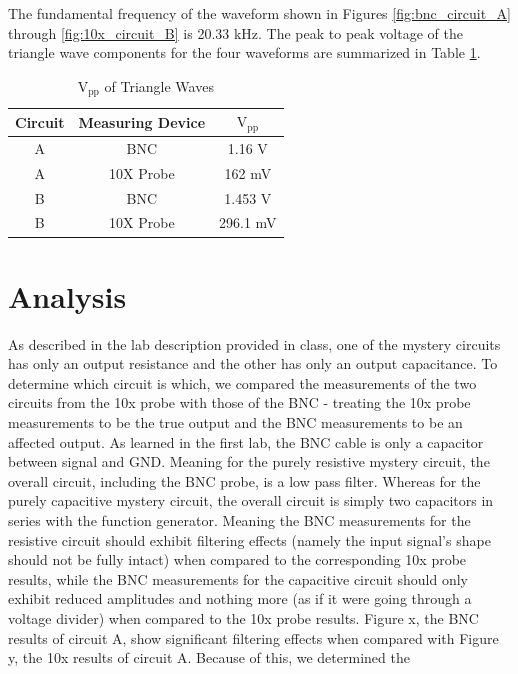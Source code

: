 \documentclass[12pt,letterpaper]{report}
\begin{document}
The fundamental frequency of the waveform shown in Figures \ref{fig:bnc_circuit_A} through \ref{fig:10x_circuit_B} is 20.33 kHz. The peak to peak voltage of the triangle wave components for the four waveforms are summarized in Table \ref{table:vpp}.

\begin{table}[ht]
\caption{$\text{V}_{\text{pp}}$ of Triangle Waves} %
\centering 
    \begin{tabular}{| c | c | c |}
    \hline  
    Circuit & Measuring Device & $\text{V}_{\text{pp}}$ \\
    \hline
    A & BNC & 1.16 V \\
    A & 10X Probe & 162 mV \\
    B & BNC & 1.453 V \\
    B & 10X Probe & 296.1 mV \\
    \hline
    \end{tabular}
    \label{table:vpp}
\end{table}

\section*{Analysis}
As described in the lab description provided in class, one of the mystery circuits has only an output resistance and the other has only an output capacitance. To determine which circuit is which, we compared the measurements of the two circuits from the 10x probe with those of the BNC - treating the 10x probe measurements to be the true output and the BNC measurements to be an affected output. As learned in the first lab, the BNC cable is only a capacitor between signal and GND. Meaning for the purely resistive mystery circuit, the overall circuit, including the BNC probe, is a low pass filter. Whereas for the purely capacitive mystery circuit, the overall circuit is simply two capacitors in series with the function generator. Meaning the BNC measurements for the resistive circuit should exhibit filtering effects (namely the input signal's shape should not be fully intact) when compared to the corresponding 10x probe results, while the BNC measurements for the capacitive circuit should only exhibit reduced amplitudes and nothing more (as if it were going through a voltage divider) when compared to the 10x probe results. Figure x, the BNC results of circuit A, show significant filtering effects when compared with Figure y, the 10x results of circuit A. Because of this, we determined the 
\end{document}
